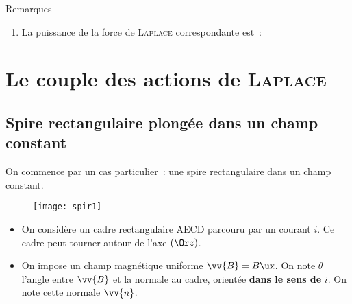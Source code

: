 \documentclass[../main/main.tex]{subfiles}
\begin{document}
\begin{rexem}{Remarques}
\begin{enumerate}[start=3]
    \item La puissance de la force de \textsc{Laplace} correspondante est~:
  \end{enumerate}
\end{rexem}

\section{Le couple des actions de \textsc{Laplace}}
\label{sec:lplcpl}

\subsection{Spire rectangulaire plongée dans un champ constant}
\label{ssec:lplcplspire}
On commence par un cas particulier~: une spire rectangulaire dans un champ
constant.
\begin{figure}[h!]
  \centering
  \texttt{[image: spir1]}
  \label{fig:spir1}
\end{figure}
\begin{itemize}[label=$\diamond$, leftmargin=10pt]
  \item On considère un cadre rectangulaire AECD parcouru par un courant $i$. Ce
    cadre peut tourner autour de l'axe $(\Or z)$.
  \item On impose un champ magnétique uniforme $\vv{B} = B\ux$. On note $\theta$
    l'angle entre $\vv{B}$ et la normale au cadre, orientée \textbf{dans le sens
    de} $i$. On note cette normale $\vv{n}$.
\end{itemize}
\end{document}
